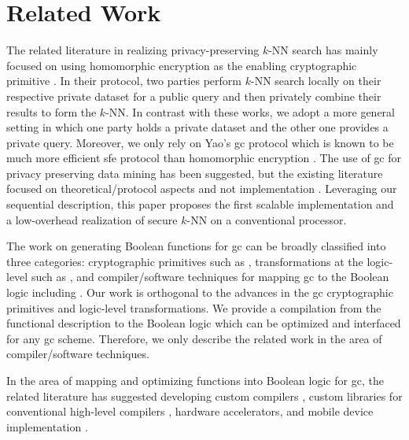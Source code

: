 \section{Related Work}\label{sec:knn-related}
The related literature in realizing privacy-preserving $k$-NN search has mainly focused on using homomorphic encryption as the enabling cryptographic primitive \cite{shaneck2009privacy,qi2008efficient}.
In their protocol, two parties perform $k$-NN search locally on their respective private dataset for a public query and then privately combine their results to form the $k$-NN.
In contrast with these works, we adopt a more general setting in which one party holds a private dataset and the other one provides a private query.
Moreover, we only rely on Yao's \acrshort{gc} protocol which is known to be much more efficient \acrshort{sfe} protocol than homomorphic encryption \cite{huang2012private,brenner2011hcrypt}.
The use of \acrshort{gc} for privacy preserving data mining has been suggested, but the existing literature focused on theoretical/protocol aspects and not implementation \cite{agrawal2000privacy}.
Leveraging our sequential description, this paper proposes the first scalable implementation and a low-overhead realization of secure $k$-NN on a conventional processor.

The work on generating Boolean functions for \acrshort{gc} can be broadly classified into three categories: cryptographic primitives such as \cite{malkhi2004fairplay,bellare2013efficient}, transformations at the logic-level such as \cite{kolesnikov2008improved}, and compiler/software techniques for mapping \acrshort{gc} to the Boolean logic including \cite{malkhi2004fairplay,holzer2012secure,kreuter2013pcf}.
Our work is orthogonal to the advances in the \acrshort{gc} cryptographic primitives and logic-level transformations.
We provide a compilation from the functional description to the Boolean logic which can be optimized and interfaced for any \acrshort{gc} scheme.
Therefore, we only describe the related work in the area of compiler/software techniques.

In the area of mapping and optimizing functions into Boolean logic for \acrshort{gc}, the related literature has suggested developing custom compilers \cite{malkhi2004fairplay,henecka2010tasty,holzer2012secure,kreuter2013pcf}, custom libraries for conventional high-level compilers \cite{huang2011faster,malka2011vmcrypt,henecka2013faster}, hardware accelerators\cite{pu2013computing,jarvinen2010garbled,bellare2013efficient}, and mobile device implementation \cite{mood2012memory}.

